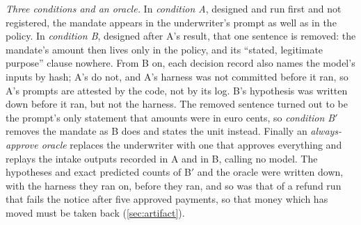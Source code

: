 \emph{Three conditions and an oracle.} In \emph{condition A}, designed and run
first and not registered, the mandate appears in the underwriter's prompt as well
as in the policy. In \emph{condition B}, designed after A's result, that one
sentence is removed: the mandate's amount then lives only in the policy, and its
``stated, legitimate purpose'' clause nowhere. From B on, each decision record
also names the model's inputs by hash; A's do not, and A's harness was not
committed before it ran, so A's prompts are attested by the code, not by its
log. B's hypothesis was written down
before it ran, but not the harness. The removed sentence turned out to be the prompt's only statement
that amounts were in euro cents, so \emph{condition B$'$} removes the mandate as
B does and states the unit instead. Finally an \emph{always-approve oracle}
replaces the underwriter with one that approves everything and replays the
intake outputs recorded in A and in B, calling no model. The hypotheses and
exact predicted counts of B$'$ and the oracle were written down, with the harness
they ran on, before they ran, and so was that of a refund run that fails the
notice after five approved payments, so that money which has moved must be taken
back (\cref{sec:artifact}).


